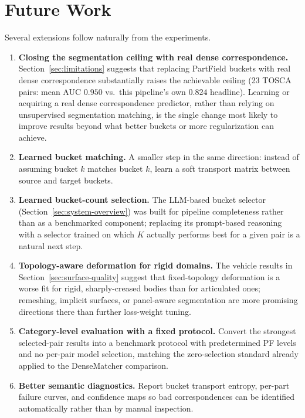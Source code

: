 \documentclass{article}
\begin{document}
\section{Future Work}
\label{sec:future-work}

Several extensions follow naturally from the experiments.

\begin{enumerate}
  \item \textbf{Closing the segmentation ceiling with real dense correspondence.}
  Section~\ref{sec:limitations} suggests that replacing PartField buckets with real dense
  correspondence substantially raises the achievable ceiling (23 TOSCA pairs: mean AUC
  $0.950$ vs.\ this pipeline's own $0.824$ headline). Learning or acquiring a real dense
  correspondence predictor, rather than relying on unsupervised segmentation matching, is the
  single change most likely to improve results beyond what better buckets or more regularization
  can achieve.
  \item \textbf{Learned bucket matching.} A smaller step in the same direction: instead of assuming
  bucket $k$ matches bucket $k$, learn a soft transport matrix between source and target buckets.
  \item \textbf{Learned bucket-count selection.} The LLM-based bucket selector
  (Section~\ref{sec:system-overview}) was built for pipeline completeness rather than as a benchmarked
  component; replacing its prompt-based reasoning with a selector trained on which $K$ actually
  performs best for a given pair is a natural next step.
  \item \textbf{Topology-aware deformation for rigid domains.} The vehicle results in
  Section~\ref{sec:surface-quality} suggest that fixed-topology deformation is a worse fit for rigid,
  sharply-creased bodies than for articulated ones; remeshing, implicit surfaces, or panel-aware
  segmentation are more promising directions there than further loss-weight tuning.
  \item \textbf{Category-level evaluation with a fixed protocol.} Convert the strongest selected-pair
  results into a benchmark protocol with predetermined PF levels and no per-pair model selection,
  matching the zero-selection standard already applied to the DenseMatcher comparison.
  \item \textbf{Better semantic diagnostics.} Report bucket transport entropy, per-part failure
  curves, and confidence maps so bad correspondences can be identified automatically rather than by
  manual inspection.
\end{enumerate}
\end{document}
